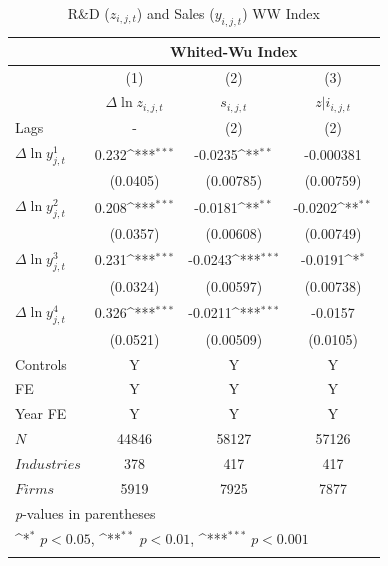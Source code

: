 \documentclass{_latex/house}
\begin{document}
\begin{table}[h]\footnotesize
\caption{R\&D ($z_{i,j,t}$) and Sales ($y_{i,j,t}$) WW Index}
\begin{center}
{
\def\sym#1{\ifmmode^{#1}\else\(^{#1}\)\fi}
\begin{tabular}{l*{3}{c}}
          &\multicolumn{3}{c}{Whited-Wu Index} \\
\hline\hline
            &\multicolumn{1}{c}{(1)}&\multicolumn{1}{c}{(2)}&\multicolumn{1}{c}{(3)}\\
            &\multicolumn{1}{c}{$\Delta \ln{z_{i,j,t}}$}&\multicolumn{1}{c}{$s_{i,j,t}$}&\multicolumn{1}{c}{$z|i_{i,j,t}$}\\
\hline
Lags & - & (2) & (2) \\
$\Delta\ln{y_{j,t}^{1}}$ &       0.232\sym{***}&     -0.0235\sym{**} &   -0.000381         \\
            &    (0.0405)         &   (0.00785)         &   (0.00759)         \\
[1em]
$\Delta\ln{y_{j,t}^{2}}$  &       0.208\sym{***}&     -0.0181\sym{**} &     -0.0202\sym{**} \\
            &    (0.0357)         &   (0.00608)         &   (0.00749)         \\
[1em]
$\Delta\ln{y_{j,t}^{3}}$  &       0.231\sym{***}&     -0.0243\sym{***}&     -0.0191\sym{*}  \\
            &    (0.0324)         &   (0.00597)         &   (0.00738)         \\
[1em]
$\Delta\ln{y_{j,t}^{4}}$  &       0.326\sym{***}&     -0.0211\sym{***}&     -0.0157         \\
            &    (0.0521)         &   (0.00509)         &    (0.0105)         \\

Controls & Y & Y & Y \\
FE & Y & Y & Y \\
Year FE & Y & Y & Y \\
\hline
\(N\)       &       44846         &       58127         &       57126         \\
\(Industries\)      &       378         &       417         &       417             \\
\(Firms\)      &       5919         &       7925          &       7877        \\
\hline\hline
\multicolumn{4}{l}{\footnotesize \textit{p}-values in parentheses}\\
\multicolumn{4}{l}{\footnotesize \sym{*} \(p<0.05\), \sym{**} \(p<0.01\), \sym{***} \(p<0.001\)}\\
\label{tab:table16}
\end{tabular}
}
\end{center}
\end{table}
\end{document}
